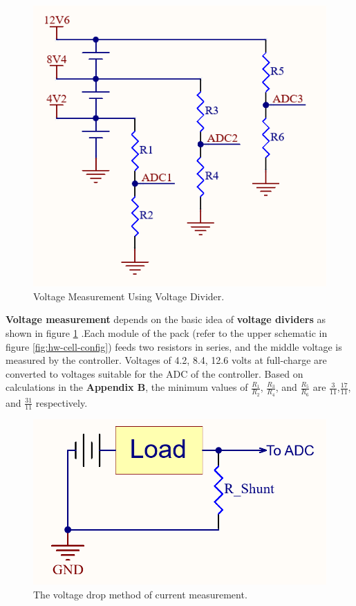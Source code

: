 \begin{figure}[h!]
    \centering
    \includegraphics[scale=0.5]{./Figures/HW/Voltage-Measurement.png}
    \caption{Voltage Measurement Using Voltage Divider.}
    \label{fig:hw-volt-mes}
\end{figure}

 \textbf{Voltage measurement} depends on the basic idea of \textbf{voltage dividers} as shown in figure \ref{fig:hw-volt-mes} .Each module of the pack (refer to the upper schematic in figure \ref{fig:hw-cell-config}) feeds two resistors in series, and the middle voltage is measured by the controller. Voltages of 4.2, 8.4, 12.6 volts at full-charge are converted to voltages suitable for the ADC of the controller. Based on calculations in the \textbf{Appendix B}, the minimum values of $\frac{R_1}{R_2}$, $\frac{R_3}{R_4}$, and $\frac{R_5}{R_6}$ are $\frac{3}{11}$,$\frac{17}{11}$, and $\frac{31}{11}$ respectively.



\begin{figure}[h!]
    \centering
    \includegraphics[scale=0.5]{./Figures/HW/Current-Measurement.png}
    \caption{The voltage drop method of current measurement.}
    \label{fig:hw-current-mes}
\end{figure}


